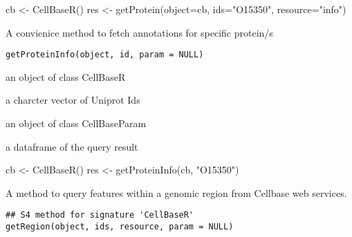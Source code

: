 \documentclass[letterpaper]{book}
\begin{document}
%
\begin{Examples}
\begin{ExampleCode}
   cb <- CellBaseR()
   res <- getProtein(object=cb, ids="O15350", resource="info")
\end{ExampleCode}
\end{Examples}
%
\begin{Description}\relax
A convienice method to fetch annotations for specific protein/s
\end{Description}
%
\begin{Usage}
\begin{verbatim}
getProteinInfo(object, id, param = NULL)
\end{verbatim}
\end{Usage}
%
\begin{Arguments}
\begin{ldescription}
\item[\code{object}] an object of class CellBaseR

\item[\code{id}] a charcter vector of Uniprot Ids

\item[\code{param}] an object of class CellBaseParam
\end{ldescription}
\end{Arguments}
%
\begin{Value}
a dataframe of the query result
\end{Value}
%
\begin{Examples}
\begin{ExampleCode}
cb <- CellBaseR()
res <- getProteinInfo(cb, "O15350")
\end{ExampleCode}
\end{Examples}
%
\begin{Description}\relax
A method to query features within a genomic region from Cellbase web 
services.
\end{Description}
%
\begin{Usage}
\begin{verbatim}
## S4 method for signature 'CellBaseR'
getRegion(object, ids, resource, param = NULL)
\end{verbatim}
\end{Usage}
%
\end{document}
